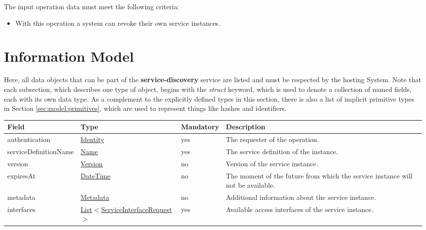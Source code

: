 \documentclass[a4paper]{arrowhead}
\newcommand{\pref}[1]{{\textcolor{ArrowheadGrey}{\hyperref[sec:model:primitives:#1]{#1}}}}
\begin{document}
The input operation data must meet the following criteria:

\begin{itemize}
    \item With this operation a system can revoke their own service instances.
\end{itemize}

\clearpage

\section{Information Model}
\label{sec:model}

Here, all data objects that can be part of the \textbf{service-discovery} service are listed and must be respected by the hosting System.
Note that each subsection, which describes one type of object, begins with the \textit{struct} keyword, which is used to denote a collection of named fields, each with its own data type.
As a complement to the explicitly defined types in this section, there is also a list of implicit primitive types in Section \ref{sec:model:primitives}, which are used to represent things like hashes and identifiers.

\label{sec:model:ServiceRegistrationRequest}
 
\begin{table}[ht!]
\begin{tabularx}{\textwidth}{| p{3.5cm} | p{4.7cm} | p{2cm} | X |} \hline
\rowcolor{gray!33} Field & Type & Mandatory & Description \\ \hline
authentication & \hyperref[sec:model:Identity]{Identity} & yes & The requester of the operation. \\ \hline
serviceDefinitionName & \pref{Name} & yes & The service definition of the instance. \\ \hline
version & \pref{Version} & no & Version of the service instance. \\ \hline
expiresAt & \pref{DateTime} & no & The moment of the future from which the service instance will not be available. \\ \hline
metadata &\hyperref[sec:model:Metadata]{Metadata} & no & Additional information about the service instance. \\ \hline
interfaces &  \pref{List}$<$\hyperref[sec:model:ServiceInterfaceRequest]{ServiceInterfaceRequest}$>$ & yes & Available access interfaces of the service instance.  \\ \hline
\end{tabularx}
\end{table}
\end{document}
